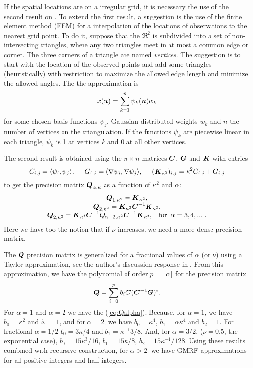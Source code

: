 If the spatial locations are on a irregular grid, 
it is necessary the use of the second result on
\cite{lindgrenRL:2011}. 
To extend the first result, a suggestion is the use of 
the finite element method (FEM) for a interpolation of 
the locations of observations to the nearest grid point. 
To do it, suppose that the $\Re^2$ is subdivided into 
a set of non-intersecting triangles, where any two
triangles meet in at most a common edge or corner. 
The three corners of a triangle are named \textit{vertices}.
The suggestion is to start with the location of the 
observed points and add some triangles (heuristically) 
with restriction to maximize the allowed edge length 
and minimize the allowed angles. 
The the approximation is 
\[x(\mbox{\protect \boldmath $u$}) = \sum_{k=1}^{n}\psi_k(\mbox{\protect \boldmath $u$})w_k\]
for some chosen basis functions {$\psi_k$}, 
Gaussian distributed weights $w_k$ and $n$ the 
number of vertices on the triangulation.
If the functions $\psi_k$ are piecewise linear in each 
triangle, $\psi_k$ is 1 at vertices $k$ and 0 at all 
other vertices. 

The second result is obtained using the $n\times n$ matrices 
$\mbox{\protect \boldmath $C$}$, $\mbox{\protect \boldmath $G$}$ and $\mbox{\protect \boldmath $K$}$ with entries 
\begin{equation}
C_{i,j} = \langle \psi_i, \psi_j\rangle, \;\;\;\;\;
G_{i,j} = \langle \nabla \psi_i, \nabla \psi_j \rangle, \;\;\;\;\;
(\mbox{\protect \boldmath $K$}_{\kappa^2})_{i,j} = \kappa^2 C_{i,j} + G_{i,j}
\end{equation}
to get the precision matrix $\mbox{\protect \boldmath $Q$}_{\alpha,\kappa}$ 
as a function of $\kappa^2$ and $\alpha$: 
\begin{equation}\label{eq:Qalpha}\begin{array}{c}
\mbox{\protect \boldmath $Q$}_{1,\kappa^2} = \mbox{\protect \boldmath $K$}_{\kappa^2}, \\
\mbox{\protect \boldmath $Q$}_{2,\kappa^2} = \mbox{\protect \boldmath $K$}_{\kappa^2}\mbox{\protect \boldmath $C$}^{-1}\mbox{\protect \boldmath $K$}_{\kappa^2}, \\
\mbox{\protect \boldmath $Q$}_{2,\kappa^2} = \mbox{\protect \boldmath $K$}_{\kappa^2}\mbox{\protect \boldmath $C$}^{-1}Q_{\alpha-2,\kappa^2}\mbox{\protect \boldmath $C$}^{-1}\mbox{\protect \boldmath $K$}_{\kappa^2}, 
\;\;\;\mbox{for} \;\;\alpha = 3,4,...\;.
\end{array}\end{equation}
Here we have too the notion that if $\nu$ increases, 
we need a more dense precision matrix. 

The $\mbox{\protect \boldmath $Q$}$ precision matrix is generalized for a fractional values 
of $\alpha$ (or $\nu$) using a Taylor approximation, 
see the author's discussion response in \cite{lindgrenRL:2011}. 
From this approximation, we have the polynomial of 
order $p=\lceil \alpha \rceil$ for the precision matrix 
\begin{equation}
\mbox{\protect \boldmath $Q$} = \sum_{i=0}^p b_i \mbox{\protect \boldmath $C$}(\mbox{\protect \boldmath $C$}^{-1}\mbox{\protect \boldmath $G$})^i.
\end{equation}
For $\alpha=1$ and $\alpha=2$ we have the (\ref{eq:Qalpha}). 
Because, for $\alpha=1$, we have $b_0=\kappa^2$ and $b_1=1$, 
and for $\alpha=2$, we have $b_0=\kappa^4$, 
$b_1=\alpha\kappa^4$ and $b_2=1$. 
For fractional $\alpha=1/2$ 
$b_0=3\kappa/4$ and $b_1=\kappa^{-1}3/8$. 
And, for $\alpha=3/2$, ($\nu=0.5$, the exponential case), 
$b_0=15\kappa^3/16$, $b_1=15\kappa/8$, 
$b_2=15\kappa^{-1}/128$. 
Using these results combined with recursive construction, 
for $\alpha>2$, we have GMRF approximations for all positive 
integers and half-integers. 

